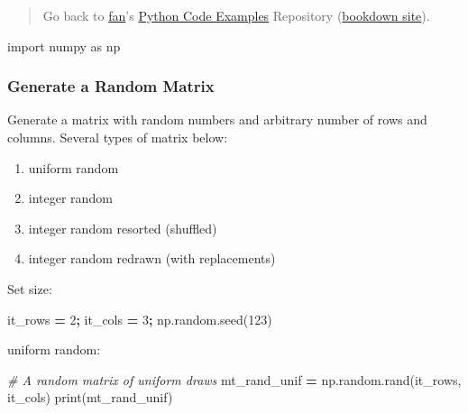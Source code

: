 \documentclass[
]{book}
\newenvironment{Shaded}{\begin{snugshade}}{\end{snugshade}}
\newcommand{\BuiltInTok}[1]{#1}
\newcommand{\CommentTok}[1]{\textcolor[rgb]{0.56,0.35,0.01}{\textit{#1}}}
\newcommand{\DecValTok}[1]{\textcolor[rgb]{0.00,0.00,0.81}{#1}}
\newcommand{\ImportTok}[1]{#1}
\newcommand{\NormalTok}[1]{#1}
\newcommand{\OperatorTok}[1]{\textcolor[rgb]{0.81,0.36,0.00}{\textbf{#1}}}
\providecommand{\tightlist}{%
  \setlength{\itemsep}{0pt}\setlength{\parskip}{0pt}}
\begin{document}
\begin{quote}
Go back to \href{http://fanwangecon.github.io/}{fan}'s \href{https://fanwangecon.github.io/pyfan/}{Python Code Examples} Repository (\href{https://fanwangecon.github.io/pyfan/bookdown}{bookdown site}).
\end{quote}

\begin{Shaded}
\begin{Highlighting}[]
\ImportTok{import}\NormalTok{ numpy }\ImportTok{as}\NormalTok{ np}
\end{Highlighting}
\end{Shaded}

\hypertarget{generate-a-random-matrix}{%
\subsubsection{Generate a Random Matrix}\label{generate-a-random-matrix}}

Generate a matrix with random numbers and arbitrary number of rows and columns. Several types of matrix below:

\begin{enumerate}
\def\labelenumi{\arabic{enumi}.}
\tightlist
\item
  uniform random
\item
  integer random
\item
  integer random resorted (shuffled)
\item
  integer random redrawn (with replacements)
\end{enumerate}

Set size:

\begin{Shaded}
\begin{Highlighting}[]
\NormalTok{it_rows }\OperatorTok{=} \DecValTok{2}\OperatorTok{;}
\NormalTok{it_cols }\OperatorTok{=} \DecValTok{3}\OperatorTok{;}
\NormalTok{np.random.seed(}\DecValTok{123}\NormalTok{)}
\end{Highlighting}
\end{Shaded}

uniform random:

\begin{Shaded}
\begin{Highlighting}[]
\CommentTok{# A random matrix of uniform draws}
\NormalTok{mt_rand_unif }\OperatorTok{=}\NormalTok{ np.random.rand(it_rows, it_cols)}
\BuiltInTok{print}\NormalTok{(mt_rand_unif)}
\end{Highlighting}
\end{Shaded}
\end{document}
